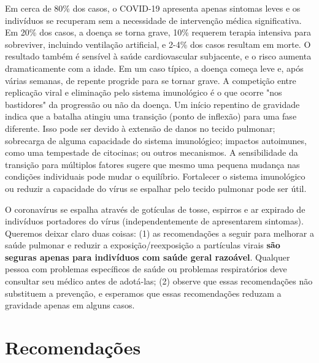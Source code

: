 \documentclass[onecolumn,journal]{IEEEtran}
\begin{document}
\begin{multicols}{2}
Em cerca de 80\% dos casos, o COVID-19 apresenta apenas sintomas leves e os indivíduos se recuperam sem a necessidade de intervenção médica significativa. Em 20\% dos casos, a doença se torna grave, 10\% requerem terapia intensiva para sobreviver, incluindo ventilação artificial, e 2-4\% dos casos resultam em morte. O resultado também é sensível à saúde cardiovascular subjacente, e o risco aumenta dramaticamente com a idade. Em um caso típico, a doença começa leve e, após várias semanas, de repente progride para se tornar grave. A competição entre replicação viral e eliminação pelo sistema imunológico é o que ocorre "nos bastidores" da progressão ou não da doença. Um início repentino de gravidade indica que a batalha atingiu uma transição (ponto de inflexão) para uma fase diferente. Isso pode ser devido à extensão de danos no tecido pulmonar; sobrecarga de alguma capacidade do sistema imunológico; impactos autoimunes, como uma tempestade de citocinas; ou outros mecanismos. A sensibilidade da transição para múltiplos fatores sugere que mesmo uma pequena mudança nas condições individuais pode mudar o equilíbrio. Fortalecer o sistema imunológico ou reduzir a capacidade do vírus se espalhar pelo tecido pulmonar pode ser útil.

O coronavírus se espalha através de gotículas de tosse, espirros e ar expirado de indivíduos portadores do vírus (independentemente de apresentarem sintomas). Queremos deixar claro duas coisas: (1) as recomendações a seguir para melhorar a saúde pulmonar e reduzir a exposição/reexposição a partículas virais \textbf{são seguras apenas para indivíduos com saúde geral razoável}. Qualquer pessoa com problemas específicos de saúde ou problemas respiratórios deve consultar seu médico antes de adotá-las; (2) observe que essas recomendações não substituem a prevenção, e esperamos que essas recomendações reduzam a gravidade apenas em alguns casos.

\section*{Recomendações}


\end{multicols}
\end{document}
